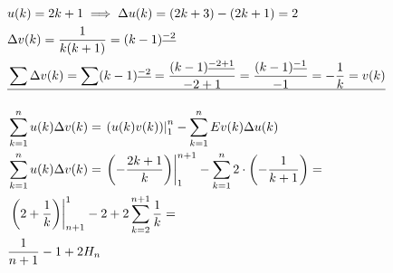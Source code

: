 \documentclass[a4paper,12pt,fleqn]{article}
\begin{document}
\begin{align*}
& u(k) = 2k+1 \implies \Delta u(k) = (2k+3) - (2k+1) = 2 \\
& \Delta v(k) = \frac{1}{k(k+1)} = (k-1)^{\underline{-2}} \\
& \sum \Delta v(k) = \sum (k-1)^{\underline{-2}} = \frac{(k-1)^{\underline{-2+1}}}{-2+1} = \frac{(k- 1)^{\underline{-1}}}{-1} = -\frac{1}{k} = v(k) \\ 
\hline \\
& \sum_{k=1}^n u(k) \Delta v(k) = \left.(u(k)v(k))\right|_1^n - \sum_{k=1}^n E v(k)\Delta u(k) \\
& \sum_{k=1}^n u(k) \Delta v(k) = \left.\left(-\frac{2k+1}{k}\right)\right|_1^{n+1} - \sum_{k=1}^n 2 \cdot \left(-\frac{1}{k+1}\right) = \\
& \left.\left(2 + \frac{1}{k} \right)\right|_{n+1}^{1} - 2 + 2 \sum_{k=2}^{n+1} \frac{1}{k} = \\
& \frac{1}{n+1} - 1 + 2H_n \\
\end{align*}
\end{document}
